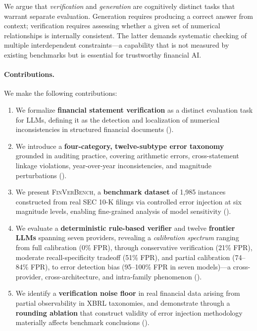 \documentclass[11pt]{article}
\newcommand{\benchmark}{\textsc{FinVerBench}}
\begin{document}
We argue that \emph{verification} and \emph{generation} are cognitively distinct tasks that warrant separate evaluation.
Generation requires producing a correct answer from context; verification requires assessing whether a given set of numerical relationships is internally consistent.
The latter demands systematic checking of multiple interdependent constraints---a capability that is not measured by existing benchmarks but is essential for trustworthy financial AI.

\paragraph{Contributions.}
We make the following contributions:
\begin{enumerate}[topsep=2pt,itemsep=1pt]
    \item We formalize \textbf{financial statement verification} as a distinct evaluation task for LLMs, defining it as the detection and localization of numerical inconsistencies in structured financial documents ().
    \item We introduce a \textbf{four-category, twelve-subtype error taxonomy} grounded in auditing practice, covering arithmetic errors, cross-statement linkage violations, year-over-year inconsistencies, and magnitude perturbations ().
    \item We present \benchmark{}, a \textbf{benchmark dataset} of 1,985 instances constructed from real SEC 10-K filings via controlled error injection at six magnitude levels, enabling fine-grained analysis of model sensitivity ().
    \item We evaluate a \textbf{deterministic rule-based verifier} and twelve \textbf{frontier LLMs} spanning seven providers, revealing a \emph{calibration spectrum} ranging from full calibration (0\% FPR), through conservative verification (21\% FPR), moderate recall-specificity tradeoff (51\% FPR), and partial calibration (74--84\% FPR), to error detection bias (95--100\% FPR in seven models)---a cross-provider, cross-architecture, and intra-family phenomenon ().
    \item We identify a \textbf{verification noise floor} in real financial data arising from partial observability in XBRL taxonomies, and demonstrate through a \textbf{rounding ablation} that construct validity of error injection methodology materially affects benchmark conclusions ().
\end{enumerate}
\end{document}
